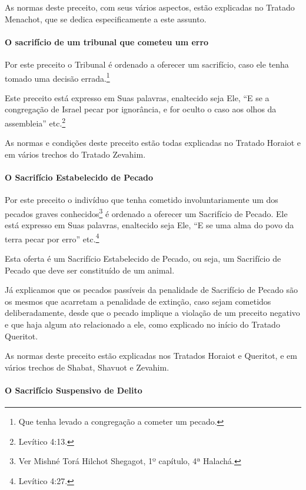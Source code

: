 \begin{multicols}{2}
As normas deste preceito, com seus vários aspectos, estão explicadas no
Tratado Menachot\starr, que se dedica especificamente a este assunto.

\paragraph{O sacrifício de um tribunal que cometeu um erro}

Por este preceito o Tribunal é ordenado a oferecer um sacrifício, caso
ele tenha tomado uma decisão errada.\footnote{Que tenha levado a congregação a cometer um pecado.}

Este preceito está expresso em Suas palavras, enaltecido seja Ele, ``E
se a congregação de Israel pecar por ignorância, e for oculto o caso aos
olhos da assembleia'' etc.\footnote{Levítico 4:13.}

As normas e condições deste preceito estão todas explicadas no Tratado
Horaiot\starr{} e em vários trechos do Tratado Zevahim\starr.

\paragraph{O Sacrifício Estabelecido de Pecado}

Por este preceito o indivíduo que
tenha cometido involuntariamente um dos pecados graves
conhecidos\footnote{Ver Mishné Torá\starr{} Hilchot\starr{} Shegagot, 1º capítulo, 4ª Halachá\starr.} é ordenado a oferecer um Sacrifício de
Pecado. Ele está expresso em Suas palavras, enaltecido seja Ele, ``E se
uma alma do povo da terra pecar por erro'' etc.\footnote{Levítico 4:27.}

Esta oferta é um Sacrifício Estabelecido de Pecado, ou seja, um Sacrifício de Pecado que deve ser constituído de um animal.

Já explicamos que os pecados passíveis da penalidade de Sacrifício de
Pecado são os mesmos que acarretam a penalidade de extinção, caso sejam
cometidos deliberadamente, desde que o pecado implique a violação de um
preceito negativo e que haja algum ato relacionado a ele, como explicado
no início do Tratado Queritot\starr.

As normas deste preceito estão explicadas nos Tratados Horaiot\starr{} e
Queritot\starr, e em vários trechos de Shabat, Shavuot\starr{} e Zevahim\starr.

\paragraph{O Sacrifício Suspensivo de Delito}


\end{multicols}
